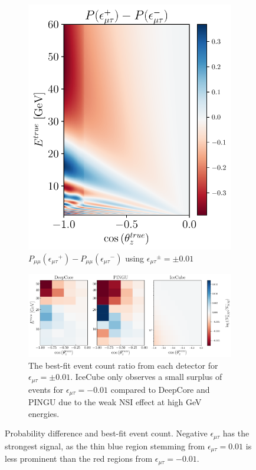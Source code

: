 \documentclass{revtex4-2}
\newcommand{\emt}{\ensuremath{\epsilon_{\mu\tau}}}
\newcommand{\Pmm}{P_{\mu\mu}}
\begin{document}
\begin{figure} %
   \begin{subfigure}{1\textwidth}
      \begin{center}
      \includegraphics[width=0.5\linewidth]{figures/Pmm_asymmetry.pdf}
      \caption{$\Pmm(\emt^+) - \Pmm(\emt^-)$ using  $\emt^\pm = \pm 0.01$}\label{fig:Pmm_asymmetry}
      \end{center}
   \end{subfigure}
   \qquad
   \begin{subfigure}{0.99\textwidth}
      \includegraphics[width=1\linewidth]{figures/emt_events.pdf}
   \caption{The best-fit event count ratio from each detector for $\emt = \pm 0.01$. IceCube only observes a small surplus of events for $\emt=-0.01$ compared to 
   DeepCore and PINGU due to the weak NSI effect at high \si{\GeV} energies.}\label{fig:emt_events}
   \end{subfigure}
   \caption{Probability difference and best-fit event count. Negative $\emt$ has the strongest signal, as the thin blue 
   region stemming from $\emt = 0.01$ is less prominent than the red regions from $\emt=-0.01$.}
\end{figure}
 
\end{document}
